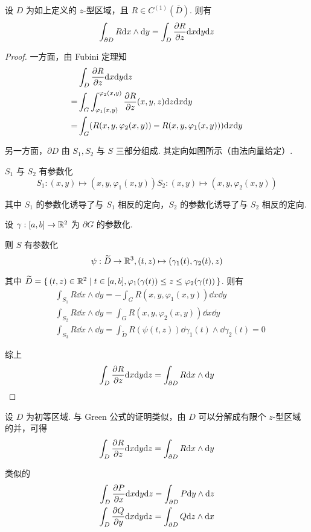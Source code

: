 \begin{lemma}
    设 $D$ 为如上定义的 $z$-型区域，且 $R\in C^{(1)}(\overline{D})$. 则有
$$
\int_{\partial D}R\mathrm{d} x\wedge\mathrm{d} y=\int_D\frac{\partial{R}}{\partial{z}}\mathrm{d} x\mathrm{d} y\mathrm{d} z
$$
\end{lemma}
\begin{proof}
    一方面，由 Fubini 定理知
$$
\begin{aligned}
    &\int_D\frac{\partial{R}}{\partial{z}}\mathrm{d} x\mathrm{d} y\mathrm{d} z\\
    =&\int_G\int_{\varphi_1(x,y)}^{\varphi_2(x,y)}\frac{\partial{R}}{\partial{z}}(x,y,z)\mathrm{d} z\mathrm{d} x\mathrm{d} y\\
    =&\int_G(R(x,y,\varphi_2(x,y))-R(x,y,\varphi_1(x,y)))\mathrm{d} x\mathrm{d} y
\end{aligned}
$$

    另一方面，$\partial D$ 由 $S_1,S_2$ 与 $S$ 三部分组成. 其定向如图所示（由法向量给定）.


    $S_1$ 与 $S_2$ 有参数化
$$
S_1:(x,y)\mapsto(x,y,\varphi_1(x,y))
S_2:(x,y)\mapsto(x,y,\varphi_2(x,y))
$$

    其中 $S_1$ 的参数化诱导了与 $S_1$ 相反的定向，$S_2$ 的参数化诱导了与 $S_2$ 相反的定向.

    设 $\gamma:[a,b]\to\mathbb{R}^2$ 为 $\partial G$ 的参数化.

    则 $S$ 有参数化
$$
\psi:\widetilde{D}\to\mathbb{R}^3,(t,z)\mapsto(\gamma_1(t),\gamma_2(t),z)
$$

    其中 $\widetilde{D}=\set{(t,z)\in\mathbb{R}^2|t\in[a,b],\varphi_1(\gamma(t))\le z\le\varphi_2(\gamma(t))}$. 则有
$$
\begin{aligned}
    &\int_{S_1}R\dd x\wedge\dd y=-\int_GR(x,y,\varphi_1(x,y))\dd x\dd y\\
    &\int_{S_2}R\dd x\wedge\dd y=\int_GR(x,y,\varphi_2(x,y))\dd x\dd y\\
    &\int_{S_3}R\dd x\wedge\dd y=\int_{\widetilde{D}}R(\psi(t,z))\dd\gamma_1(t)\wedge\dd\gamma_2(t)=0
\end{aligned}
$$

    综上
$$
\int_D\frac{\partial{R}}{\partial{z}}\mathrm{d} x\mathrm{d} y\mathrm{d} z=\int_{\partial D}R\mathrm{d} x\wedge\mathrm{d} y
$$
\end{proof}

设 $D$ 为初等区域. 与 Green 公式的证明类似，由 $D$ 可以分解成有限个 $z$-型区域的并，可得
$$
\int_D\frac{\partial{R}}{\partial{z}}\mathrm{d} x\mathrm{d} y\mathrm{d} z=\int_{\partial D}R\mathrm{d} x\wedge\mathrm{d} y
$$

类似的
$$
\begin{aligned}
    \int_D\frac{\partial{P}}{\partial{x}}\mathrm{d} x\mathrm{d} y\mathrm{d} z=\int_{\partial D}P\mathrm{d} y\wedge\mathrm{d} z\\
    \int_D\frac{\partial{Q}}{\partial{y}}\mathrm{d} x\mathrm{d} y\mathrm{d} z=\int_{\partial D}Q\mathrm{d} z\wedge\mathrm{d} x
\end{aligned}
$$

